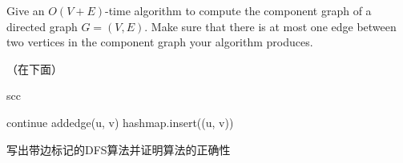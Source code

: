 \documentclass[a4paper, justified]{tufte-handout}
\begin{document}
\begin{problem}[TC 22.5-5]
Give an $O(V+E)$-time algorithm to compute the component graph of a directed graph $G=(V,E)$. Make sure that there is at most one edge between two vertices in the component graph your algorithm produces.
\end{problem}

\begin{solution}
  （在下面）

  \noindent
  \begin{algorithm}
    \caption{scc}\label{euclid}
    \begin{algorithmic}[1]
      \State continue
      \EndIf
      \State addedge(u, v)
      \State hashmap.insert((u, v))
      \EndIf
      \EndFor
      \EndFor
      \EndProcedure
    \end{algorithmic}
  \end{algorithm}
\end{solution}


\beginoptional

\begin{problem}[TC 22.5-7]
\end{problem}

\begin{solution}
\end{solution}


\beginot
\begin{ot}

\end{ot}


\begin{ot}[带边标记的DFS算法]
  写出带边标记的DFS算法并证明算法的正确性
\end{ot}

\end{document}
